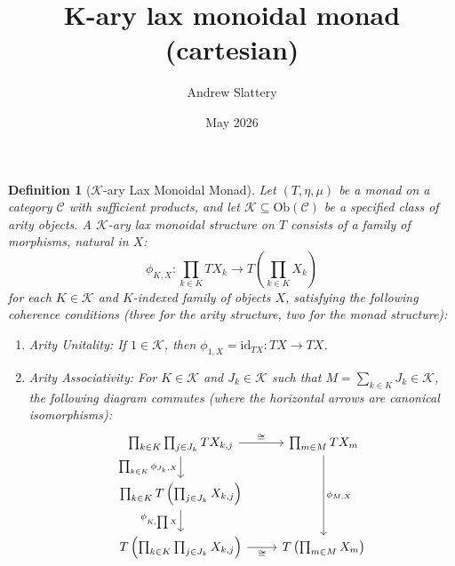\documentclass{article}
\title{K-ary lax monoidal monad (cartesian)}
\author{Andrew Slattery}
\date{May 2026}
\newtheorem{definition}{Definition}
\begin{document}
\maketitle

\begin{definition}[$\mathcal{K}$-ary Lax Monoidal Monad]
Let $(T, \eta, \mu)$ be a monad on a category $\mathcal{C}$ with sufficient products, and let $\mathcal{K} \subseteq \mathrm{Ob}(\mathcal{C})$ be a specified class of arity objects. A \emph{$\mathcal{K}$-ary lax monoidal structure} on $T$ consists of a family of morphisms, natural in $X$:
\[
\phi_{K, X} : \prod_{k \in K} TX_k \longrightarrow T\left(\prod_{k \in K} X_k\right)
\]
for each $K \in \mathcal{K}$ and $K$-indexed family of objects $X$, satisfying the following coherence conditions (three for the arity structure, two for the monad structure):

\begin{enumerate}
    \item \emph{Arity Unitality:} If $1 \in \mathcal{K}$, then $\phi_{1, X} = \mathrm{id}_{TX}: TX \to TX$.

    \item \emph{Arity Associativity:} For $K \in \mathcal{K}$ and $J_k \in \mathcal{K}$ such that $M = \sum_{k \in K} J_k \in \mathcal{K}$, the following diagram commutes (where the horizontal arrows are canonical isomorphisms):
    \[\begin{tikzcd}
	{\prod_{k \in K} \prod_{j \in J_k} TX_{k,j}} & {\prod_{m \in M} TX_m} \\
	{\prod_{k \in K} T\left(\prod_{j \in J_k} X_{k,j}\right)} \\
	{T\left(\prod_{k \in K} \prod_{j \in J_k} X_{k,j}\right)} & {T\left(\prod_{m \in M} X_m\right)}
	\arrow["\cong", from=1-1, to=1-2]
	\arrow["{\prod_{k \in K} \phi_{J_k, X}}"', from=1-1, to=2-1]
	\arrow["{\phi_{M, X}}", from=1-2, to=3-2]
	\arrow["{\phi_{K, \prod X}}"', from=2-1, to=3-1]
	\arrow["\cong"', from=3-1, to=3-2]
    \end{tikzcd}\]
    

\end{enumerate}
\end{definition}
\end{document}

